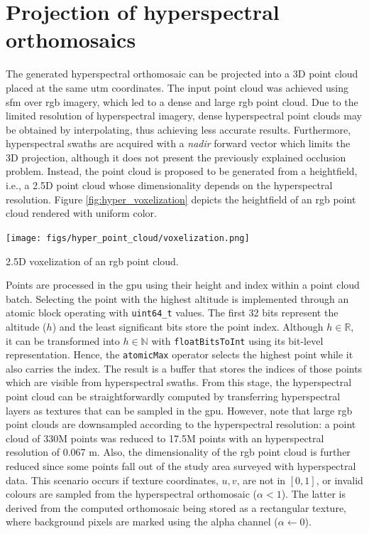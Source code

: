 \section{Projection of hyperspectral orthomosaics}

The generated hyperspectral orthomosaic can be projected into a 3D point cloud placed at the same \acrshort{utm} coordinates. The input point cloud was achieved using \acrshort{sfm} over \acrshort{rgb} imagery, which led to a dense and large \acrshort{rgb} point cloud. Due to the limited resolution of hyperspectral imagery, dense hyperspectral point clouds may be obtained by interpolating, thus achieving less accurate results. Furthermore, hyperspectral swaths are acquired with a \textit{nadir} forward vector which limits the 3D projection, although it does not present the previously explained occlusion problem. Instead, the point cloud is proposed to be generated from a heightfield, i.e., a 2.5D point cloud whose dimensionality depends on the hyperspectral resolution. Figure \ref{fig:hyper_voxelization} depicts the heightfield of an \acrshort{rgb} point cloud rendered with uniform color.

\begin{marginfigure}[.1cm]
    \centering
    \texttt{[image: figs/hyper\_point\_cloud/voxelization.png]}
	\caption{2.5D voxelization of an \acrshort{rgb} point cloud. }
	\label{fig:hyper_voxelization}
\end{marginfigure}
Points are processed in the \acrshort{gpu} using their height and index within a point cloud batch. Selecting the point with the highest altitude is implemented through an atomic block operating with \verb|uint64_t| values. The first 32 bits represent the altitude ($h$) and the least significant bits store the point index. Although $h \in \mathbb{R}$, it can be transformed into $h \in \mathbb{N}$ with \verb|floatBitsToInt| using its bit-level representation. Hence, the \verb|atomicMax| operator selects the highest point while it also carries the index. The result is a buffer that stores the indices of those points which are visible from hyperspectral swaths. From this stage, the hyperspectral point cloud can be straightforwardly computed by transferring hyperspectral layers as textures that can be sampled in the \acrshort{gpu}. However, note that large \acrshort{rgb} point clouds are downsampled according to the hyperspectral resolution: a point cloud of 330M points was reduced to 17.5M points with an hyperspectral resolution of 0.067 \si{\meter}. Also, the dimensionality of the \acrshort{rgb} point cloud is further reduced since some points fall out of the study area surveyed with hyperspectral data. This scenario occurs if texture coordinates, $u, v$, are not in $\left[0, 1\right]$, or invalid colours are sampled from the hyperspectral orthomosaic ($\alpha < 1$). The latter is derived from the computed orthomosaic being stored as a rectangular texture, where background pixels are marked using the alpha channel ($\alpha \gets 0$). 

